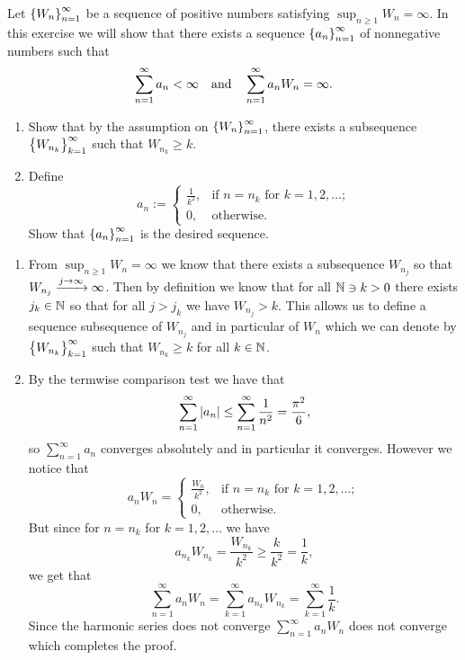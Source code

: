 \documentclass[11pt,a4paper]{article}
\begin{document}
\begin{exercise}
  \label{ex:lemma-of-w}
  Let $\left\{W_n\right\}_{n=1}^{\infty}$ be a sequence of positive numbers
  satisfying $\sup_{n \geq 1} W_n = \infty$.
  In this exercise we will show that
  there exists a sequence $\left\{a_n\right\}_{n=1}^{\infty}$ of nonnegative
  numbers such that
  \[
    \sum_{n=1}^{\infty} a_n < \infty \quad \text{and} \quad
    \sum_{n=1}^{\infty} a_n W_n = \infty.
  \]
  \begin{enumerate}
    \item[(1)] Show that by the assumption on $\left\{W_n\right\}_{n=1}^{\infty}$,
      there exists a subsequence $\left\{W_{n_k}\right\}_{k=1}^{\infty}$
      such that $W_{n_{k}} \geq k$.
    \item[(2)] Define
      \[
        a_n :=
        \begin{cases}
          \frac{1}{k^2}, &\text{if } n = n_k \text{ for } k=1,2,\dots; \\
          0, &\text{otherwise}.
        \end{cases}
      \]
      Show that $\left\{a_n\right\}_{n=1}^{\infty}$ is the desired sequence.
  \end{enumerate}
\end{exercise}
\begin{solution} \phantom{}
  \begin{enumerate}
    \item[(1)] From $\sup_{n \geq 1} W_n = \infty$ we know that there exists
      a subsequence $W_{n_{j}}$
      so that $W_{n_{j}} \xrightarrow{j \to \infty} \infty$.
      Then by definition we know that for all $\mathbb{N} \ni k > 0$ there exists
      $j_k \in \mathbb{N}$ so that for all $j > j_k$ we have $W_{n_{j}} > k$.
      This allows us to define a sequence subsequence of $W_{n_j}$
      and in particular of $W_{n}$ which we can denote
      by $\left\{W_{n_k}\right\}_{k=1}^{\infty}$ such that $W_{n_{k}} \geq k$
      for all $k \in \mathbb{N}$.
    \item[(2)] By the termwise comparison test we have that
      \[
        \sum_{n=1}^{\infty} \left\lvert a_n\right\rvert \le
        \sum_{n=1}^{\infty} \frac{1}{n^2} = \frac{\pi^2}{6},
      \]
      so $\sum_{n=1}^{\infty} a_n$ converges absolutely and in particular
      it converges.
      However we notice that
      \[
        a_n W_n =
        \begin{cases}
          \frac{W_n}{k^2}, &\text{if } n = n_k \text{ for } k=1,2,\dots; \\
          0, &\text{otherwise}.
        \end{cases}
      \]
      But since for $n = n_k$ for $k=1,2,\dots$ we have
      \[
        a_{n_k} W_{n_k} =
        \frac{W_{n_k}}{k^2} \geq \frac{k}{k^2} = \frac{1}{k},
      \]
      we get that
      \[
        \sum_{n=1}^{\infty} a_n W_n =
        \sum_{k=1}^{\infty} a_{n_k} W_{n_k} =
        \sum_{k=1}^{\infty} \frac{1}{k}.
      \]
      Since the harmonic series does not converge $\sum_{n=1}^{\infty} a_n W_n$
      does not converge which completes the proof.
  \end{enumerate}
\end{solution}
\end{document}

